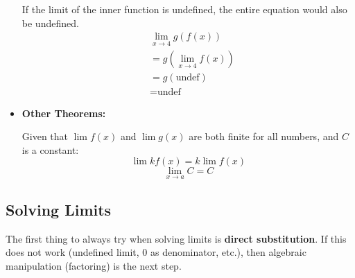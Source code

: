 \documentclass[12pt]{article}
\begin{document}
\begin{itemize}
	      If the limit of the inner function is undefined, the entire equation would also be undefined.
	      \begin{align*}
		      & \lim_{x \to 4} g\left( f(x) \right)   \\
		      & = g\left( \lim_{x \to 4} f(x) \right) \\
		      & = g(\text{undef})                     \\
		      & = \text{undef}
	      \end{align*}
	      \smallskip

	\item \textbf{Other Theorems:}

	      Given that $\lim f(x)$ and $\lim g(x)$ are both finite for all numbers, and $C$ is a constant:
	      \[ \lim k f(x) = k \lim f(x) \]
	      \[ \lim_{x \to a} C = C \]
	      \smallskip
\end{itemize}

\begin{figure}[H]
	\begin{center}
		\caption[Figure 2]{}
		\label{fig:limproperties}
	\end{center}
\end{figure}

\subsection{Solving Limits}
The first thing to always try when solving limits is \textbf{direct substitution}. If this does not work (undefined limit, 0 as denominator, etc.), then algebraic manipulation (factoring) is the next step.
\end{document}

